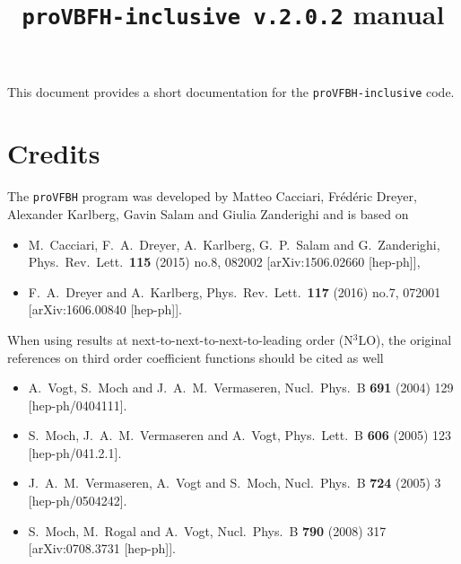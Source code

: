 \documentclass[12pt,a4]{article}
\title{\texttt{proVBFH-inclusive v.2.0.2} manual}
\newcommand{\provbfh}{\texttt{proVFBH}\xspace}
\newcommand{\provbfhincl}{\texttt{proVFBH-inclusive}\xspace}
\begin{document}
\maketitle

This document provides a short documentation for the \provbfhincl code.
\section{Credits}
The \provbfh program was developed by Matteo Cacciari, Fr\'ed\'eric
Dreyer, Alexander Karlberg, Gavin Salam and Giulia Zanderighi and is
based on
\begin{itemize}
  \item M.~Cacciari, F.~A.~Dreyer, A.~Karlberg, G.~P.~Salam and G.~Zanderighi,
  Phys.\ Rev.\ Lett.\  {\bf 115} (2015) no.8,  082002
  [arXiv:1506.02660 [hep-ph]],
\item F.~A.~Dreyer and A.~Karlberg,
  Phys.\ Rev.\ Lett.\  {\bf 117} (2016) no.7,  072001
  [arXiv:1606.00840 [hep-ph]].
\end{itemize}

When using results at next-to-next-to-next-to-leading order (N$^3$LO), the
original references on third order coefficient functions should be
cited as well
\begin{itemize}
\item A.~Vogt, S.~Moch and J.~A.~M.~Vermaseren,
  Nucl.\ Phys.\ B {\bf 691} (2004) 129
  [hep-ph/0404111].
\item S.~Moch, J.~A.~M.~Vermaseren and A.~Vogt,
  Phys.\ Lett.\ B {\bf 606} (2005) 123
  [hep-ph/041.2.1].
\item J.~A.~M.~Vermaseren, A.~Vogt and S.~Moch,
  Nucl.\ Phys.\ B {\bf 724} (2005) 3
  [hep-ph/0504242].
\item S.~Moch, M.~Rogal and A.~Vogt,
  Nucl.\ Phys.\ B {\bf 790} (2008) 317
  [arXiv:0708.3731 [hep-ph]].
\end{itemize}
\end{document}
